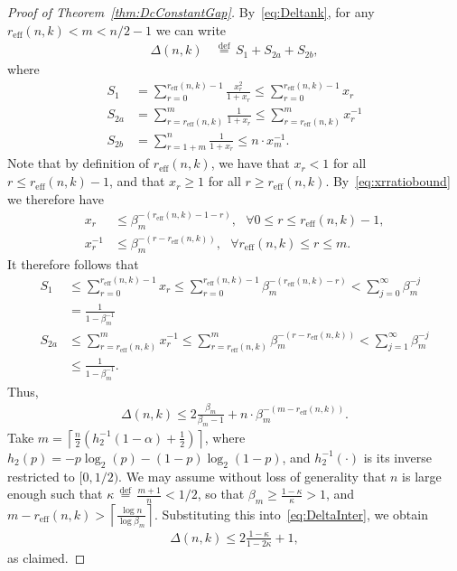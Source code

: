 \documentclass[article,doublecolumn]{IEEEtran}
\newcommand{\df}{{\, \stackrel{\mathrm{def}}{=}\, }}
\newcommand{\reff}{{r_{\mathrm{eff}}}}
\begin{document}
\begin{proof}[Proof of Theorem~\ref{thm:DcConstantGap}]
By~\eqref{eq:Deltank}, for any $\reff(n,k)<m<n/2-1$ we can write
\begin{align}
\Delta(n,k)&\df S_1+S_{2a}+S_{2b},
\end{align}
where
\begin{align}
 S_1&=\sum_{r=0}^{\reff(n,k)-1}\frac{x_r^2}{1+x_r}\leq \sum_{r=0}^{\reff(n,k)-1} x_r\\
 S_{2a}&=\sum_{r=\reff(n,k)}^m \frac{1}{1+x_r}\leq \sum_{r=\reff(n,k)}^m x_r^{-1}\\
 S_{2b}&=\sum_{r=1+m}^n \frac{1}{1+x_r}\leq n \cdot x^{-1}_{m}.
\end{align}
Note that by definition of $\reff(n,k)$, we have that $x_r< 1$ for all $r\leq \reff(n,k)-1$, and that $x_r\geq 1$ for all $r\geq  \reff(n,k)$. By~\eqref{eq:xrratiobound} we therefore have
\begin{align}
x_r&\leq \beta_m^{-(\reff(n,k)-1-r)},~~~\forall 0\leq r\leq \reff(n,k)-1,\\
x^{-1}_r&\leq \beta_m^{-(r-\reff(n,k))},~~~\forall  \reff(n,k)\leq r\leq m.
\end{align}
It therefore follows that
\begin{align}
S_1&\leq\sum_{r=0}^{\reff(n,k)-1} x_r\leq \sum_{r=0}^{\reff(n,k)-1} \beta_m^{-(\reff(n,k)-r)}<\sum_{j=0}^\infty\beta_m^{-j}\nonumber\\
&=\frac{1}{1-\beta_m^{-1}}\\
S_{2a}&\leq\sum_{r=\reff(n,k)}^m x^{-1}_r\leq \sum_{r=\reff(n,k)}^m \beta_m^{-(r-\reff(n,k))}<\sum_{j=1}^\infty\beta_m^{-j}\nonumber\\
&\leq\frac{1}{1-\beta_m^{-1}}.
\end{align}
Thus,
\begin{align}
    \Delta(n,k)\leq 2\frac{\beta_m}{\beta_m-1}+n\cdot  \beta_m^{-(m-\reff(n,k))}.
    \label{eq:DeltaInter}
\end{align}
Take $m=\left\lceil \frac{n}{2}\left(h_2^{-1}(1-\alpha)+\frac{1}{2} \right) \right\rceil$, where $h_2(p)=-p\log_2(p)-(1-p)\log_2(1-p)$, and $h_2^{-1}(\cdot)$ is its inverse restricted to $[0,1/2)$. We may assume without loss of generality that $n$ is large enough such that $\kappa\df\frac{m+1}{n}<1/2$, so that $\beta_m\geq \frac{1-\kappa}{\kappa}>1$, and $m-\reff(n,k)>\left\lceil\frac{\log n}{\log \beta_m}\right\rceil$. Substituting this into~\eqref{eq:DeltaInter}, we obtain
\begin{align}
\Delta(n,k)\leq 2\frac{1-\kappa}{1-2\kappa}+1,    
\end{align}
as claimed.
\end{proof}
\end{document}
